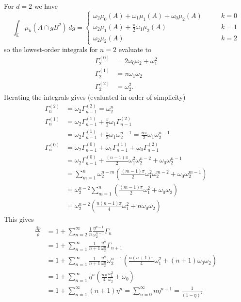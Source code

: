 \documentclass[11pt]{report}
\begin{document}
For $d=2$ we have
\begin{equation}
  \int_{\mathbb{E}} \mu_k (A \cap g B^2) \, dg =
  \begin{cases}
    \omega_2 \mu_0(A) + \omega_1 \mu_1(A) + \omega_0 \mu_2(A) & \qquad k=0 \\
    \omega_2 \mu_1(A) + \frac{\pi}{2} \omega_1 \mu_2(A) & \qquad k=1 \\
    \omega_2 \mu_2(A) & \qquad k=2
  \end{cases}
\end{equation}
so the lowest-order integrals for $n=2$ evaluate to
\begin{align}
  \Gamma_2^{(0)} &= 2 \omega_0 \omega_2 + \omega_1^2 \\
  \Gamma_2^{(1)} &= \pi \omega_1 \omega_2 \\
  \Gamma_2^{(2)} &= \omega_2^2.
\end{align}
Iterating the integrals gives (evaluated in order of simplicity)
\begin{align}
  \Gamma_n^{(2)} &=
  \omega_2 \Gamma_{n-1}^{(2)}
  = \omega_2^n \\
  \Gamma_n^{(1)} &=
  \omega_2 \Gamma_{n-1}^{(1)}
  + \frac{\pi}{2} \omega_1 \Gamma_{n-1}^{(2)}
  \nonumber \\ &=
  \omega_2 \Gamma_{n-1}^{(1)}
  + \frac{\pi}{2} \omega_1 \omega_2^{n-1}
  = \frac{n \pi}{2} \omega_1 \omega_2^{n-1} \\
  \Gamma_n^{(0)} &=
  \omega_2 \Gamma_{n-1}^{(0)}
  + \omega_1 \Gamma_{n-1}^{(1)}
  + \omega_0 \Gamma_{n-1}^{(2)}
  \nonumber \\ &=
  \omega_2 \Gamma_{n-1}^{(0)}
  + \frac{(n-1) \pi}{2} \omega_1^2 \omega_2^{n-2}
  + \omega_0 \omega_2^{n-1}
  \nonumber \\ &=
  \sum_{m=1}^n \omega_2^{n-m} \left(
  \frac{(m-1)\pi}{2} \omega_1^2 \omega_2^{m-2}
  + \omega_0 \omega_2^{m-1}
  \right)
  \nonumber \\ &=
  \omega_2^{n-2}
  \sum_{m=1}^n \left(
  \frac{(m-1)\pi}{2} \omega_1^2
  + \omega_0 \omega_2
  \right)
  \nonumber \\ &=
  \omega_2^{n-2}
  \left(
  \frac{n(n-1)\pi}{4} \omega_1^2
  + n \omega_0 \omega_2
  \right)
\end{align}
This gives
\begin{equation}
  \begin{split}
    \frac{\beta p}{\rho} &=
    1 + \sum_{n=2}^\infty \frac{1}{n} \frac{\eta^{n-1}}{\omega_2^{n-1}} \Gamma_n
    \\ &=
    1 + \sum_{n=1}^\infty \frac{1}{n+1} \frac{\eta^n}{\omega_2^n} \Gamma_{n+1}
    \\ &=
    1 + \sum_{n=1}^\infty \frac{1}{n+1} \frac{\eta^n}{\omega_2^n}
    \omega_2^{n-1}
    \left(
    \frac{n(n+1)\pi}{4} \omega_1^2
    + (n+1) \omega_0 \omega_2
    \right)
    \\ &=
    1 + \sum_{n=1}^\infty \eta^n
    \left(
    \frac{n\pi}{4} \frac{\omega_1^2}{\omega_2}
    + \omega_0
    \right)
    \\ &=
    1 + \sum_{n=1}^\infty (n+1) \eta^n =
    \sum_{n=0}^\infty n \eta^{n-1}
    = \frac{1}{(1-\eta)^2}
  \end{split}
\end{equation}
\end{document}
